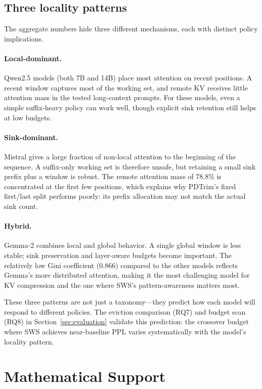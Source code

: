 \documentclass[11pt]{article}
\newcommand{\method}{SWS}
\newcommand{\pct}{\%}
\theoremstyle{definition}
\theoremstyle{plain}
\begin{document}
\subsection{Three locality patterns}
The aggregate numbers hide three different mechanisms, each with distinct policy implications.

\paragraph{Local-dominant.} Qwen2.5 models (both 7B and 14B) place most attention on recent positions.  A recent window captures most of the working set, and remote KV receives little attention mass in the tested long-context prompts.  For these models, even a simple suffix-heavy policy can work well, though explicit sink retention still helps at low budgets.

\paragraph{Sink-dominant.} Mistral gives a large fraction of non-local attention to the beginning of the sequence.  A suffix-only working set is therefore unsafe, but retaining a small sink prefix plus a window is robust.  The remote attention mass of 78.8\pct{} is concentrated at the first few positions, which explains why PDTrim's fixed first/last split performs poorly: its prefix allocation may not match the actual sink count.

\paragraph{Hybrid.} Gemma-2 combines local and global behavior.  A single global window is less stable; sink preservation and layer-aware budgets become important.  The relatively low Gini coefficient (0.866) compared to the other models reflects Gemma's more distributed attention, making it the most challenging model for KV compression and the one where \method{}'s pattern-awareness matters most.

These three patterns are not just a taxonomy---they predict how each model will respond to different policies.  The eviction comparison (RQ7) and budget scan (RQ8) in Section~\ref{sec:evaluation} validate this prediction: the crossover budget where \method{} achieves near-baseline PPL varies systematically with the model's locality pattern.

\section{Mathematical Support}
\label{sec:theory}
\end{document}

